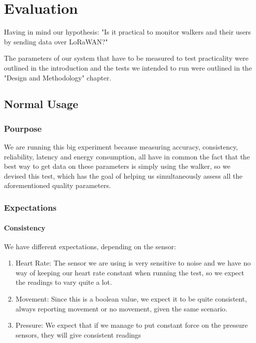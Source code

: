 \chapter{Evaluation}
\label{cha:evaluation}

Having in mind our hypothesis: "Is it practical to monitor walkers and their users by sending data over LoRaWAN?"

The parameters of our system that have to be measured to test practicality were outlined in the introduction and the tests we intended to run were outlined in the "Design and Methodology" chapter.


\section{Normal Usage}

	\subsection{Pourpose}
		We are running this big experiment because measuring accuracy, consistency, reliability, latency and energy consumption, all have in common the fact that the best way to get data on these parameters is simply using the walker, so we devised this test, which has the goal of helping us simultaneously assess all the aforementioned quality parameters.

	\subsection{Expectations}
		\subsubsection{Consistency}
			We have different expectations, depending on the sensor:

			\begin{enumerate}
				\item Heart Rate: The sensor we are using is very sensitive to noise and we have no way of keeping our heart rate constant when running the test, so we expect the readings to vary quite a lot.
				\item Movement: Since this is a boolean value, we expect it to be quite consistent, always reporting movement or no movement, given the same scenario.
				\item Pressure: We expect that if we manage to put constant force on the pressure sensors, they will give consistent readings
			\end{enumerate}

